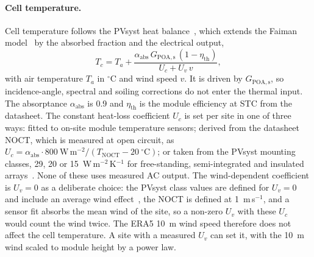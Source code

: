 \documentclass[11pt]{article}
\begin{document}
\paragraph{Cell temperature.}
Cell temperature follows the PVsyst heat balance~\cite{pvsystUvalueMeasurement2026,holmgrenPvlibPythonPython2018}, which extends the Faiman model~\cite{faimanAssessingOutdoor2008} by the absorbed fraction and the electrical output,
\begin{equation}
T_c=T_a+\frac{\alpha_{\mathrm{abs}}\,G_{\mathrm{POA,s}}\,(1-\eta_{\mathrm{th}})}{U_c+U_v\,v},
\label{eq:tcell}
\end{equation}
with air temperature $T_a$ in $^{\circ}$C and wind speed $v$. It is driven by $G_{\mathrm{POA,s}}$, so incidence-angle, spectral and soiling corrections do not enter the thermal input. The absorptance $\alpha_{\mathrm{abs}}$ is 0.9 and $\eta_{\mathrm{th}}$ is the module efficiency at STC from the datasheet. The constant heat-loss coefficient $U_c$ is set per site in one of three ways: fitted to on-site module temperature sensors; derived from the datasheet NOCT, which is measured at open circuit, as $U_c=\alpha_{\mathrm{abs}}\cdot800~\mathrm{W\,m^{-2}}/(T_{\mathrm{NOCT}}-20~^{\circ}\mathrm{C})$; or taken from the PVsyst mounting classes, 29, 20 or 15~W\,m$^{-2}$\,K$^{-1}$ for free-standing, semi-integrated and insulated arrays~\cite{pvsystUvalueMeasurement2026}. None of these uses measured AC output. The wind-dependent coefficient is $U_v=0$ as a deliberate choice: the PVsyst class values are defined for $U_v=0$ and include an average wind effect~\cite{pvsystUvalueMeasurement2026}, the NOCT is defined at 1~m\,s$^{-1}$, and a sensor fit absorbs the mean wind of the site, so a non-zero $U_v$ with these $U_c$ would count the wind twice. The ERA5 10~m wind speed therefore does not affect the cell temperature. A site with a measured $U_v$ can set it, with the 10~m wind scaled to module height by a power law.
\end{document}
